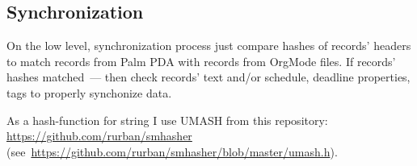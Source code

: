 \documentclass[a4paper,12pt,oneside]{scrartcl}
\begin{document}
\subsection{Synchronization}
\label{sec:synchronization}

On the low level, synchronization process just compare hashes of records'
headers to match records from Palm PDA with records from OrgMode files. If
records' hashes matched~--- then check records' text and/or schedule, deadline
properties, tags to properly synchonize data.

As a hash-function for string I use UMASH from this repository:
\url{https://github.com/rurban/smhasher}
(see~\url{https://github.com/rurban/smhasher/blob/master/umash.h}).

\newpage

\printbibliography[heading=bibintoc]
\end{document}
